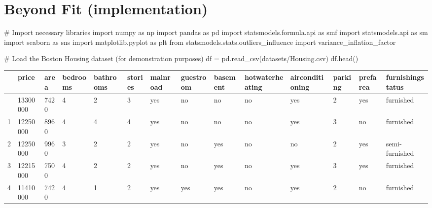\documentclass[
  letterpaper,
  DIV=11,
  numbers=noendperiod]{scrreprt}
\newenvironment{Shaded}{\begin{snugshade}}{\end{snugshade}}
\newcommand{\CommentTok}[1]{\textcolor[rgb]{0.37,0.37,0.37}{#1}}
\newcommand{\ImportTok}[1]{\textcolor[rgb]{0.00,0.46,0.62}{#1}}
\newcommand{\NormalTok}[1]{\textcolor[rgb]{0.00,0.23,0.31}{#1}}
\newcommand{\OperatorTok}[1]{\textcolor[rgb]{0.37,0.37,0.37}{#1}}
\newcommand{\StringTok}[1]{\textcolor[rgb]{0.13,0.47,0.30}{#1}}
\begin{document}

\chapter{Beyond Fit (implementation)}\label{beyond-fit-implementation}

\begin{Shaded}
\begin{Highlighting}[]
\CommentTok{\# Import necessary libraries}
\ImportTok{import}\NormalTok{ numpy }\ImportTok{as}\NormalTok{ np}
\ImportTok{import}\NormalTok{ pandas }\ImportTok{as}\NormalTok{ pd}
\ImportTok{import}\NormalTok{ statsmodels.formula.api }\ImportTok{as}\NormalTok{ smf}
\ImportTok{import}\NormalTok{ statsmodels.api }\ImportTok{as}\NormalTok{ sm}
\ImportTok{import}\NormalTok{ seaborn }\ImportTok{as}\NormalTok{ sns}
\ImportTok{import}\NormalTok{ matplotlib.pyplot }\ImportTok{as}\NormalTok{ plt}
\ImportTok{from}\NormalTok{ statsmodels.stats.outliers\_influence }\ImportTok{import}\NormalTok{ variance\_inflation\_factor}
\end{Highlighting}
\end{Shaded}

\begin{Shaded}
\begin{Highlighting}[]
\CommentTok{\# Load the Boston Housing dataset (for demonstration purposes)}
\NormalTok{df }\OperatorTok{=}\NormalTok{ pd.read\_csv(}\StringTok{\textquotesingle{}datasets/Housing.csv\textquotesingle{}}\NormalTok{)}
\NormalTok{df.head()}
\end{Highlighting}
\end{Shaded}

\begin{longtable}[]{@{}llllllllllllll@{}}
\toprule\noalign{}
& price & area & bedrooms & bathrooms & stories & mainroad & guestroom &
basement & hotwaterheating & airconditioning & parking & prefarea &
furnishingstatus \\
\midrule\noalign{}
\endhead
\bottomrule\noalign{}
\endlastfoot
0 & 13300000 & 7420 & 4 & 2 & 3 & yes & no & no & no & yes & 2 & yes &
furnished \\
1 & 12250000 & 8960 & 4 & 4 & 4 & yes & no & no & no & yes & 3 & no &
furnished \\
2 & 12250000 & 9960 & 3 & 2 & 2 & yes & no & yes & no & no & 2 & yes &
semi-furnished \\
3 & 12215000 & 7500 & 4 & 2 & 2 & yes & no & yes & no & yes & 3 & yes &
furnished \\
4 & 11410000 & 7420 & 4 & 1 & 2 & yes & yes & yes & no & yes & 2 & no &
furnished \\
\end{longtable}
\end{document}
